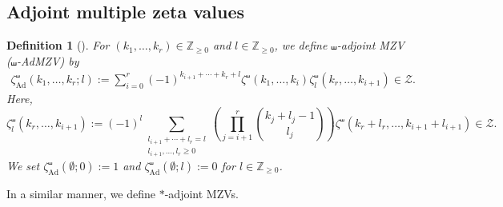 \documentclass[15pt,oneside,reqno]{amsart}
\newcounter{dfcounter}
\newtheorem{df}{Definition}[dfcounter]
\theoremstyle{remark}{
\newtheorem{lem}[df]{Lemma}
\newtheorem{prop}[df]{Proposition}
\newtheorem{ex}[df]{Example}
\newtheorem{rmk}[df]{Remark}
}
\newcommand{\Ad}{\mathrm{Ad}}
\newcommand{\sAdmzv}[2]{\zeta_{\mathrm{Ad}}^{\shuffle}(#2;#1)}
\begin{document}
\subsection{Adjoint multiple zeta values}



\begin{df}[{\cite[Definition 2.3.1]{Jarossay}}]
For $(k_1,\ldots,k_r) \in \mathbb{Z}_{\ge 0}$ and $l \in\mathbb{Z}_{\ge 0}$, we define $\shuffle$-adjoint MZV ($\shuffle$-AdMZV) by
\begin{align*}
\sAdmzv{l}{k_1,\ldots,k_r} := \sum_{i = 0}^r (-1)^{k_{i+1}+\cdots + k_r + l}\zeta^{\shuffle}(k_1,\ldots,k_i)\zeta_l^{\shuffle}(k_r,\ldots,k_{i+1}) \in \mathcal{Z}.
\end{align*}
Here, 
\[
\zeta_{l}^{\shuffle}(k_r,\ldots,k_{i+1}) := (-1)^l \sum_{\substack{l_{i+1}+\cdots+l_r = l \\ l_{i+1},\ldots,l_r\ge 0}}
\left(\prod_{j = i+1}^r \binom{k_j + l_j-1}{l_j}\right)
\zeta^{\shuffle}(k_r+l_r,\ldots,k_{i+1}+l_{i+1}) \in \mathcal{Z}.
\]
We set $\zeta_{\Ad}^{\shuffle}(\emptyset;0) := 1$ and $\zeta_{\Ad}^{\shuffle}(\emptyset;l) := 0$ for $l \in \mathbb{Z}_{\ge 0}$.
\end{df}

In a similar manner, we define $*$-adjoint MZVs.
\end{document}
